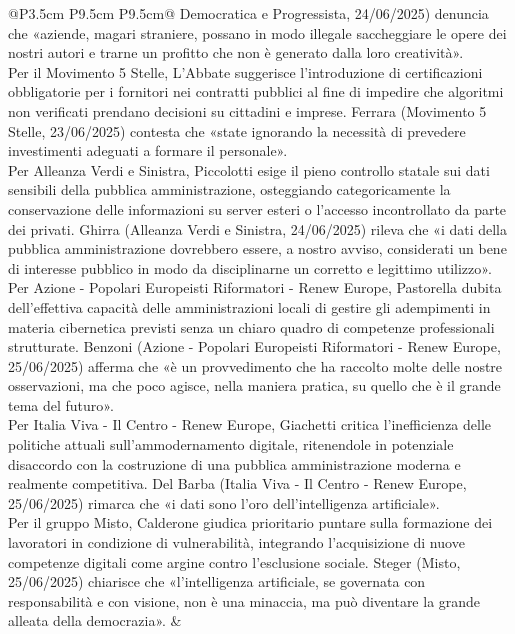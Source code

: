 \documentclass[a4paper,11pt]{article}
\begin{document}
\begin{landscape}
\begin{longtable}{@{}P{3.5cm} P{9.5cm} P{9.5cm}@{}}
Democratica e Progressista, 24/06/2025) denuncia che «aziende, magari straniere, possano in modo illegale saccheggiare le opere dei nostri autori e trarne un profitto che non è generato dalla loro creatività».\\[6pt] Per il Movimento 5 Stelle, L'Abbate suggerisce l'introduzione di certificazioni obbligatorie per i fornitori nei contratti pubblici al fine di impedire che algoritmi non verificati prendano decisioni su cittadini e imprese. Ferrara (Movimento 5 Stelle, 23/06/2025) contesta che «state ignorando la necessità di prevedere investimenti adeguati a formare il personale».\\[6pt] Per Alleanza Verdi e Sinistra, Piccolotti esige il pieno controllo statale sui dati sensibili della pubblica amministrazione, osteggiando categoricamente la conservazione delle informazioni su server esteri o l'accesso incontrollato da parte dei privati. Ghirra (Alleanza Verdi e Sinistra, 24/06/2025) rileva che «i dati della pubblica amministrazione dovrebbero essere, a nostro avviso, considerati un bene di interesse pubblico in modo da disciplinarne un corretto e legittimo utilizzo».\\[6pt] Per Azione - Popolari Europeisti Riformatori - Renew Europe, Pastorella dubita dell'effettiva capacità delle amministrazioni locali di gestire gli adempimenti in materia cibernetica previsti senza un chiaro quadro di competenze professionali strutturate. Benzoni (Azione - Popolari Europeisti Riformatori - Renew Europe, 25/06/2025) afferma che «è un provvedimento che ha raccolto molte delle nostre osservazioni, ma che poco agisce, nella maniera pratica, su quello che è il grande tema del futuro».\\[6pt] Per Italia Viva - Il Centro - Renew Europe, Giachetti critica l'inefficienza delle politiche attuali sull'ammodernamento digitale, ritenendole in potenziale disaccordo con la costruzione di una pubblica amministrazione moderna e realmente competitiva. Del Barba (Italia Viva - Il Centro - Renew Europe, 25/06/2025) rimarca che «i dati sono l'oro dell'intelligenza artificiale».\\[6pt] Per il gruppo Misto, Calderone giudica prioritario puntare sulla formazione dei lavoratori in condizione di vulnerabilità, integrando l'acquisizione di nuove competenze digitali come argine contro l'esclusione sociale. Steger (Misto, 25/06/2025) chiarisce che «l'intelligenza artificiale, se governata con responsabilità e con visione, non è una minaccia, ma può diventare la grande alleata della democrazia». & \\

\end{longtable}
\end{landscape}
\end{document}
